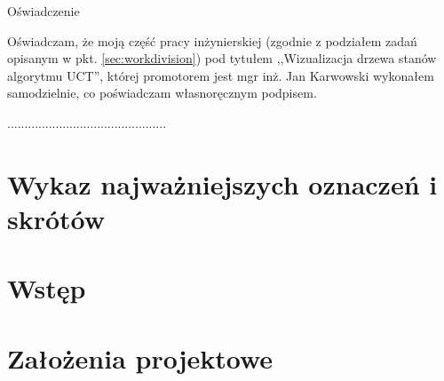 \documentclass[a4paper,11pt,twoside]{report}
\newcommand\blankpage{%
	\null
	\thispagestyle{empty}%
	\addtocounter{page}{-1}%
	\newpage}
\theoremstyle{definition}
\newcommand{\tytul}{Wizualizacja drzewa stanów algorytmu UCT}
\newcommand{\supervisor}{mgr inż. Jan Karwowski }
\begin{document}
\begin{center}
Oświadczenie
\end{center}

\indent Oświadczam, że moją część pracy inżynierskiej (zgodnie z podziałem zadań opisanym w pkt. \ref{sec:workdivision}) pod tytułem ,,\tytul '', której promotorem jest \supervisor wykonałem samodzielnie, co poświadczam własnoręcznym podpisem.
\vspace{2cm}

\begin{flushright}
  \begin{minipage}{50mm}
    \begin{center}
      ..............................................

    \end{center}
  \end{minipage}
\end{flushright}

\thispagestyle{empty}
\newpage

\null\thispagestyle{empty}\newpage


\tableofcontents
\thispagestyle{empty}


\null\thispagestyle{empty}\newpage
\pagestyle{fancy}
\setcounter{page}{11} %

\chapter*{Wykaz najważniejszych oznaczeń i skrótów}


\afterpage{\blankpage}

\chapter{Wstęp} \label{chap:wstep}


\afterpage{\blankpage}

\chapter{Założenia projektowe} \label{chap:zal_pr}

\end{document}
